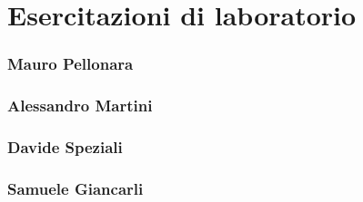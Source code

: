 \section{Esercitazioni di laboratorio}
\subsubsection*{Mauro Pellonara} 

\subsubsection*{Alessandro Martini}

\subsubsection*{Davide Speziali}

\subsubsection*{Samuele Giancarli}